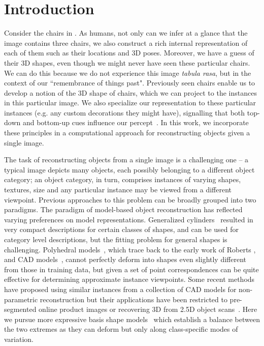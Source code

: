 \section{Introduction}

Consider the chairs in . As humans, not only can we infer at a glance that the image contains three chairs, we also construct a rich internal representation of each of them such as their locations and 3D poses. Moreover, we have a guess of their 3D shapes, even though we might never have seen these particular chairs. We can do this because we do not experience this image {\em tabula rasa}, but in the context of our  ``remembrance of things past".   Previously seen chairs enable us to develop a notion of the 3D shape of chairs, which we can project to the instances in this particular image. We also specialize our representation to these particular instances (e.g. any custom decorations they might have), signalling that both top-down and bottom-up cues influence our percept~\cite{nandakumar2011little}. In this work, we incorporate these principles in a computational approach for reconstructing objects given a single image. 

The task of reconstructing objects from a single image is a challenging one -- a typical image depicts many objects, each possibly belonging to a different object category; an object category, in turn, comprises instances of varying shapes, textures, size \etc and any particular instance may be viewed from a different viewpoint. Previous approaches to this problem can be broadly grouped into two paradigms. The paradigm of model-based object reconstruction has reflected varying preferences on model representations.  Generalized cylinders~\cite{nevatia1977description} resulted in very compact descriptions for certain classes of shapes, and can be used for category level descriptions, but the fitting problem for general shapes is challenging. Polyhedral models~\cite{gupta2010blocks,xiao2012localizing}, which trace back to the early work of Roberts \cite{roberts1963machine}, and CAD models~\cite{limparsing,satkin20143dnn,Pepik_2015_CVPR_Workshops}, cannot perfectly deform into shapes even slightly different from those in training data, but given a set of point correspondences can be quite effective for determining approximate instance viewpoints. Some recent methods have proposed using similar instances from a collection of CAD models \cite{su2014estimating,huang2015single} for  non-parametric reconstruction but their applications have been restricted to pre-segmented online product images or recovering 3D from 2.5D object scans~\cite{sung2015data}. Here we pursue more expressive basis shape models~\cite{Anguelov:SCAPE2005,blanz1999morphable,zia2013detailed} which establish a balance between the two extremes as they can deform but only along class-specific modes of variation.

